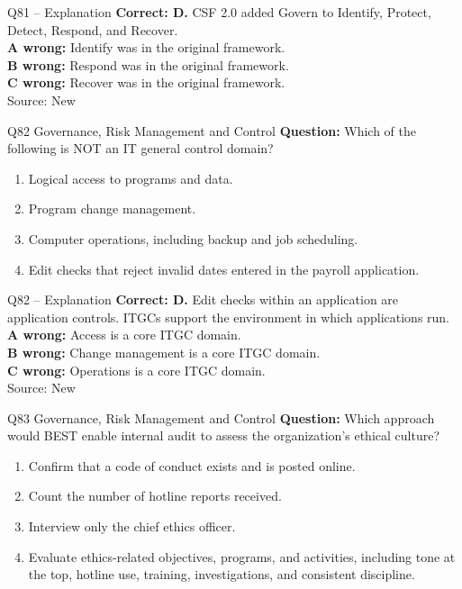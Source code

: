 \documentclass[aspectratio=169,10pt]{beamer}
\begin{document}
\begin{frame}[t]{Q81 -- Explanation}
	\footnotesize
	\textbf{Correct: D.} CSF 2.0 added Govern to Identify, Protect, Detect, Respond, and Recover. \\[5pt]
\textbf{A wrong:} Identify was in the original framework. \\[3pt]
\textbf{B wrong:} Respond was in the original framework. \\[3pt]
\textbf{C wrong:} Recover was in the original framework. \\[3pt]
	\vfill {\tiny Source: New}
\end{frame}

\begin{frame}[t]{Q82 \hfill {\scriptsize Governance, Risk Management and Control}}
	\small
	\textbf{Question:} Which of the following is NOT an IT general control domain?
	\begin{enumerate}[label=\Alph*.,itemsep=1pt,topsep=3pt]
			\item Logical access to programs and data.
			\item Program change management.
			\item Computer operations, including backup and job scheduling.
			\item Edit checks that reject invalid dates entered in the payroll application.
	\end{enumerate}
\end{frame}

\begin{frame}[t]{Q82 -- Explanation}
	\footnotesize
	\textbf{Correct: D.} Edit checks within an application are application controls. ITGCs support the environment in which applications run. \\[5pt]
\textbf{A wrong:} Access is a core ITGC domain. \\[3pt]
\textbf{B wrong:} Change management is a core ITGC domain. \\[3pt]
\textbf{C wrong:} Operations is a core ITGC domain. \\[3pt]
	\vfill {\tiny Source: New}
\end{frame}

\begin{frame}[t]{Q83 \hfill {\scriptsize Governance, Risk Management and Control}}
	\small
	\textbf{Question:} Which approach would BEST enable internal audit to assess the organization's ethical culture?
	\begin{enumerate}[label=\Alph*.,itemsep=1pt,topsep=3pt]
			\item Confirm that a code of conduct exists and is posted online.
			\item Count the number of hotline reports received.
			\item Interview only the chief ethics officer.
			\item Evaluate ethics-related objectives, programs, and activities, including tone at the top, hotline use, training, investigations, and consistent discipline.
	\end{enumerate}
\end{frame}
\end{document}
